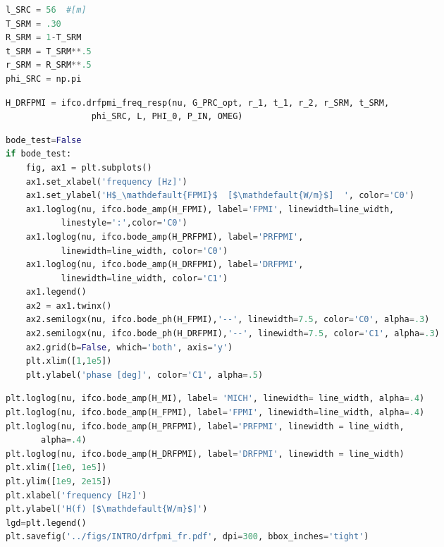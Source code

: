 \begin{spacing}{1.2}\begin{lstlisting}[frame=single, language=Python]
l_SRC = 56  #[m]
T_SRM = .30
R_SRM = 1-T_SRM
t_SRM = T_SRM**.5
r_SRM = R_SRM**.5
phi_SRC = np.pi
\end{lstlisting}\end{spacing}

\begin{spacing}{1.2}\begin{lstlisting}[frame=single, language=Python]
H_DRFPMI = ifco.drfpmi_freq_resp(nu, G_PRC_opt, r_1, t_1, r_2, r_SRM, t_SRM, 
				 phi_SRC, L, PHI_0, P_IN, OMEG)
\end{lstlisting}\end{spacing}

\begin{spacing}{1.2}\begin{lstlisting}[frame=single, language=Python]
bode_test=False
if bode_test:
    fig, ax1 = plt.subplots()
    ax1.set_xlabel('frequency [Hz]')
    ax1.set_ylabel('H$_\mathdefault{FPMI}$  [$\mathdefault{W/m}$]  ', color='C0')
    ax1.loglog(nu, ifco.bode_amp(H_FPMI), label='FPMI', linewidth=line_width, 
	       linestyle=':',color='C0')
    ax1.loglog(nu, ifco.bode_amp(H_PRFPMI), label='PRFPMI',  
	       linewidth=line_width, color='C0')
    ax1.loglog(nu, ifco.bode_amp(H_DRFPMI), label='DRFPMI',  
	       linewidth=line_width, color='C1')
    ax1.legend()
    ax2 = ax1.twinx()
    ax2.semilogx(nu, ifco.bode_ph(H_FPMI),'--', linewidth=7.5, color='C0', alpha=.3)
    ax2.semilogx(nu, ifco.bode_ph(H_DRFPMI),'--', linewidth=7.5, color='C1', alpha=.3)
    ax2.grid(b=False, which='both', axis='y')
    plt.xlim([1,1e5])
    plt.ylabel('phase [deg]', color='C1', alpha=.5)
\end{lstlisting}\end{spacing}

\begin{spacing}{1.2}\begin{lstlisting}[frame=single, language=Python]
plt.loglog(nu, ifco.bode_amp(H_MI), label= 'MICH', linewidth= line_width, alpha=.4)
plt.loglog(nu, ifco.bode_amp(H_FPMI), label='FPMI', linewidth=line_width, alpha=.4)
plt.loglog(nu, ifco.bode_amp(H_PRFPMI), label='PRFPMI', linewidth = line_width, 
	   alpha=.4)
plt.loglog(nu, ifco.bode_amp(H_DRFPMI), label='DRFPMI', linewidth = line_width)
plt.xlim([1e0, 1e5])
plt.ylim([1e9, 2e15])
plt.xlabel('frequency [Hz]')
plt.ylabel('H(f) [$\mathdefault{W/m}$]')
lgd=plt.legend()
plt.savefig('../figs/INTRO/drfpmi_fr.pdf', dpi=300, bbox_inches='tight')
\end{lstlisting}\end{spacing}

